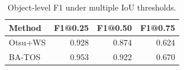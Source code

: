 \begin{table}[t]
\centering
\caption{Object-level F1 under multiple IoU thresholds.}
\label{tab:multi_iou}
\begin{tabular}{lrrr}
\hline
Method & F1@0.25 & F1@0.50 & F1@0.75 \\
\hline
Otsu+WS & 0.928 & 0.874 & 0.624 \\
BA-TOS & 0.953 & 0.922 & 0.670 \\
\hline
\end{tabular}
\end{table}
